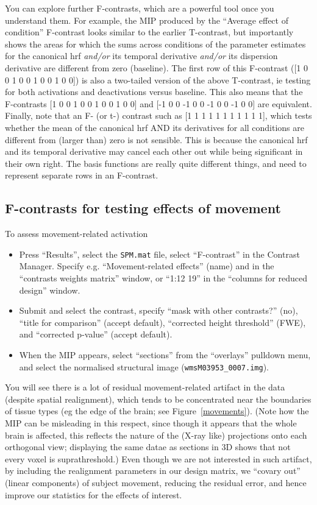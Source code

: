 You can explore further F-contrasts, which are a powerful tool once you understand them. For example, the MIP produced by the ``Average effect of condition'' F-contrast looks similar to the earlier T-contrast, but importantly shows the areas for which the sums across conditions of the parameter estimates for the canonical hrf \emph{and/or} its temporal derivative \emph{and/or} its dispersion derivative are different from zero (baseline). The first row of this F-contrast ([1 0 0 1 0 0 1 0 0 1 0 0]) is also a two-tailed version of the above T-contrast, ie testing for both activations and deactivations versus baseline. This also means that the F-contrasts [1 0 0 1 0 0 1 0 0 1 0 0] and [-1 0 0 -1 0 0 -1 0 0 -1 0 0] are equivalent. Finally, note that an F- (or t-) contrast such as [1 1 1 1 1 1 1 1 1 1 1], which tests whether the mean of the canonical hrf AND its derivatives for all conditions are different from (larger than) zero is not sensible. This is because the canonical hrf and its temporal derivative may cancel each other out while being significant in their own right. The basis functions are really quite different things, and need to represent separate rows in an F-contrast. 

\subsection{F-contrasts for testing effects of movement}

To assess movement-related activation
\begin{itemize}
\item Press ``Results'', select the \texttt{SPM.mat} file, select ``F-contrast'' in the Contrast Manager. Specify e.g. ``Movement-related effects'' (name) and 
in the ``contrasts weights matrix'' window, or ``1:12 19'' in the ``columns for reduced design'' window.
\item Submit and select the contrast, specify ``mask with other contrasts?'' (no), ``title for comparison'' (accept default), ``corrected height threshold'' (FWE), and ``corrected p-value'' (accept default). 
\item When the MIP appears, select ``sections'' from the ``overlays'' pulldown menu, and select the normalised structural image (\texttt{wmsM03953\_0007.img}).
\end{itemize}

You will see there is a lot of residual movement-related artifact in the data (despite spatial realignment), which tends to be concentrated near the boundaries of tissue types (eg the edge of the brain; see Figure~\ref{movements}). (Note how the MIP can be misleading in this respect, since though it appears that the whole brain is affected, this reflects the nature of the (X-ray like) projections onto each orthogonal view; displaying the same datae as sections in 3D shows that not every voxel is suprathreshold.)  Even though we are not interested in such artifact, by including the realignment parameters in our design matrix, we ``covary out'' (linear components) of subject movement, reducing the residual error, and hence improve our statistics for the effects of interest.

